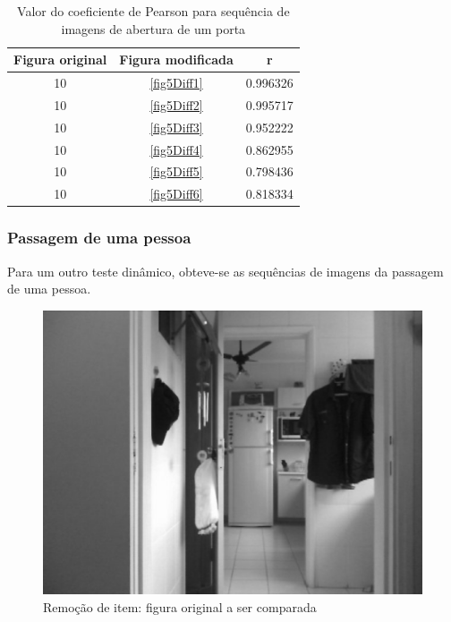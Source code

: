 \documentclass[10pt,a4paper]{article}
\begin{document}
\vspace{-0.5cm}
\begin{table}[h!]
  \begin{center}
    \caption{Valor do coeficiente de Pearson para sequência de imagens
      de abertura de um porta}
    \begin{tabular}{|c|c|c|}
      \hline
      Figura original & Figura modificada & r\\
      \hline
      10 &  \ref{fig5Diff1} & 0.996326\\
      10 &  \ref{fig5Diff2} & 0.995717\\
      10 &  \ref{fig5Diff3} & 0.952222\\
      10 &  \ref{fig5Diff4} & 0.862955\\
      10 &  \ref{fig5Diff5} & 0.798436\\
      10 &  \ref{fig5Diff6} & 0.818334\\
      \hline
    \end{tabular}
  \end{center}
\end{table}


\newpage
\subsubsection{Passagem de uma pessoa}
Para um outro teste dinâmico, obteve-se as sequências de imagens da
passagem de uma pessoa.

\begin{figure}[h!]
  \begin{center}
    \includegraphics[scale=0.35]{photos/pessoa/gBase}
    \caption{Remoção de item: figura original a ser comparada}
  \end{center}
  \label{pessoa}
\end{figure}
\end{document}
